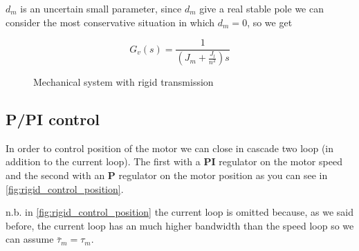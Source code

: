 $d_m$ is an uncertain small parameter, since $d_m$ give a real stable pole we can consider the most conservative situation in which $d_m=0$, so we get

$$ G_v(s) = \frac{1}{\left(J_m + \frac{J_l}{n^2}\right) s} $$

\begin{figure}
\centering
{}%
\caption{Mechanical system with rigid transmission}
\label{fig:mechanical_system_rigid}
\end{figure}

\subsection{P/PI control}

In order to control position of the motor we can close in cascade two loop (in addition to the current loop). The first with a \textbf{PI} regulator on the motor speed and the second with an \textbf{P} regulator on the motor position as you can see in \autoref{fig:rigid_control_position}.

\begin{em}
n.b. in \autoref{fig:rigid_control_position} the current loop is omitted because, as we said before, the current loop has an much higher bandwidth than the speed loop so we can assume $\bar{\tau}_m=\tau_m$.
\end{em}

